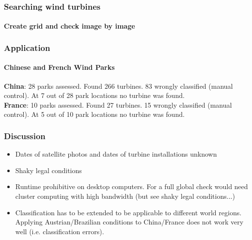 \documentclass[color=usenames,dvipsnames]{beamer}
\begin{document}
\begin{frame}
\frametitle{Searching wind turbines}
\framesubtitle{Create grid and check image by image}


\end{frame}



\begin{frame}
\frametitle{Application}
\framesubtitle{Chinese and French Wind Parks}
\textbf{China}: 28 parks assessed. Found 266 turbines. 83 wrongly classified (manual control). At 7 out of 28 park locations no turbine was found.\\

\textbf{France}: 10 parks assessed. Found 27 turbines. 15 wrongly classified (manual control). At 5 out of 10 park locations no turbine was found.

\end{frame}

\begin{frame}
\frametitle{Discussion}
\begin{itemize}
 \item Dates of satellite photos and dates of turbine installations unknown
 \item Shaky legal conditions
 \item Runtime prohibitive on desktop computers. For a full global check would need cluster computing with high bandwidth (but see shaky legal conditions...) 
 \item Classification has to be extended to be applicable to different world regions. Applying Austrian/Brazilian conditions to China/France does not work very well (i.e. classification errors).
\end{itemize}

\end{frame}
\end{document}
